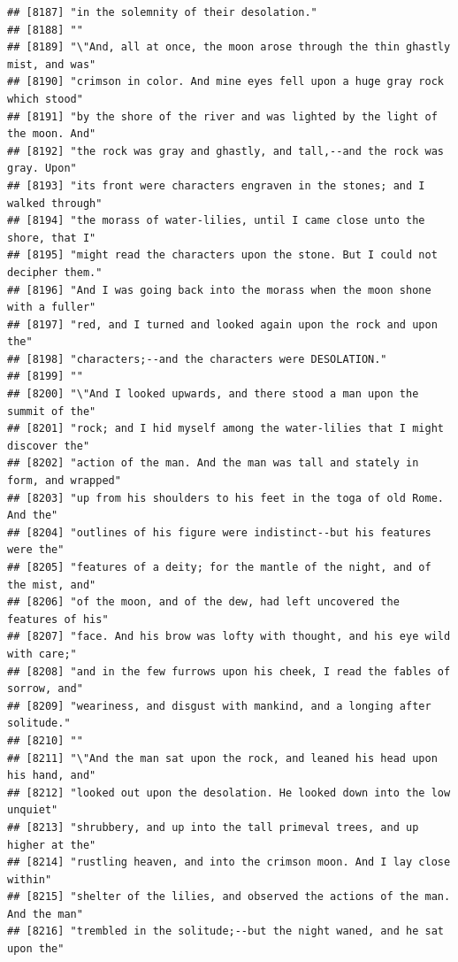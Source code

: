 \documentclass{article}\usepackage[]{graphicx}\usepackage[]{color}
\makeatletter
\newenvironment{kframe}{%
 \def\at@end@of@kframe{}%
 \ifinner\ifhmode%
  \def\at@end@of@kframe{\end{minipage}}%
  \begin{minipage}{\columnwidth}%
 \fi\fi%
 \def\FrameCommand##1{\hskip\@totalleftmargin \hskip-\fboxsep
 \colorbox{shadecolor}{##1}\hskip-\fboxsep
     \hskip-\linewidth \hskip-\@totalleftmargin \hskip\columnwidth}%
 \MakeFramed {\advance\hsize-\width
   \@totalleftmargin\z@ \linewidth\hsize
   \@setminipage}}%
 {\par\unskip\endMakeFramed%
 \at@end@of@kframe}
\newenvironment{knitrout}{}{} %
\makeatother
\begin{document}
\begin{knitrout}
\begin{kframe}
\begin{verbatim}
## [8187] "in the solemnity of their desolation."                                       
## [8188] ""                                                                            
## [8189] "\"And, all at once, the moon arose through the thin ghastly mist, and was"   
## [8190] "crimson in color. And mine eyes fell upon a huge gray rock which stood"      
## [8191] "by the shore of the river and was lighted by the light of the moon. And"     
## [8192] "the rock was gray and ghastly, and tall,--and the rock was gray. Upon"       
## [8193] "its front were characters engraven in the stones; and I walked through"      
## [8194] "the morass of water-lilies, until I came close unto the shore, that I"       
## [8195] "might read the characters upon the stone. But I could not decipher them."    
## [8196] "And I was going back into the morass when the moon shone with a fuller"      
## [8197] "red, and I turned and looked again upon the rock and upon the"               
## [8198] "characters;--and the characters were DESOLATION."                            
## [8199] ""                                                                            
## [8200] "\"And I looked upwards, and there stood a man upon the summit of the"        
## [8201] "rock; and I hid myself among the water-lilies that I might discover the"     
## [8202] "action of the man. And the man was tall and stately in form, and wrapped"    
## [8203] "up from his shoulders to his feet in the toga of old Rome. And the"          
## [8204] "outlines of his figure were indistinct--but his features were the"           
## [8205] "features of a deity; for the mantle of the night, and of the mist, and"      
## [8206] "of the moon, and of the dew, had left uncovered the features of his"         
## [8207] "face. And his brow was lofty with thought, and his eye wild with care;"      
## [8208] "and in the few furrows upon his cheek, I read the fables of sorrow, and"     
## [8209] "weariness, and disgust with mankind, and a longing after solitude."          
## [8210] ""                                                                            
## [8211] "\"And the man sat upon the rock, and leaned his head upon his hand, and"     
## [8212] "looked out upon the desolation. He looked down into the low unquiet"         
## [8213] "shrubbery, and up into the tall primeval trees, and up higher at the"        
## [8214] "rustling heaven, and into the crimson moon. And I lay close within"          
## [8215] "shelter of the lilies, and observed the actions of the man. And the man"     
## [8216] "trembled in the solitude;--but the night waned, and he sat upon the"         

\end{verbatim}
\end{kframe}
\end{knitrout}
\end{document}
